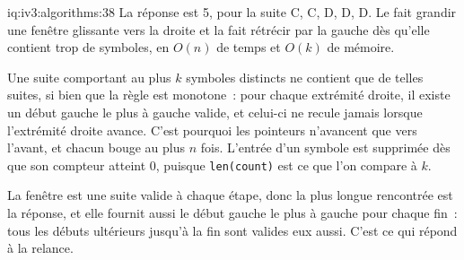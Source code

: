 \begin{solution}{iq:iv3:algorithms:38}
La réponse est 5, pour la suite C, C, D, D, D. Le  fait grandir une fenêtre glissante vers la droite et la fait rétrécir par la gauche dès qu'elle contient trop de symboles, en $O(n)$ de temps et $O(k)$ de mémoire.
\label{lst:iv3:al:kdistinct}

Une suite comportant au plus $k$ symboles distincts ne contient que de telles suites, si bien que la règle est monotone~: pour chaque extrémité droite, il existe un début gauche le plus à gauche valide, et celui-ci ne recule jamais lorsque l'extrémité droite avance. C'est pourquoi les pointeurs n'avancent que vers l'avant, et chacun bouge au plus $n$ fois. L'entrée d'un symbole est supprimée dès que son compteur atteint 0, puisque \texttt{len(count)} est ce que l'on compare à $k$.

La fenêtre est une suite valide à chaque étape, donc la plus longue rencontrée est la réponse, et elle fournit aussi le début gauche le plus à gauche pour chaque fin~: tous les débuts ultérieurs jusqu'à la fin sont valides eux aussi. C'est ce qui répond à la relance.

\end{solution}

